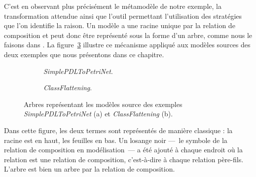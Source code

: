 C'est en observant plus précisément le métamodèle de notre exemple, la
transformation attendue ainsi que l'outil permettant l'utilisation des
stratégies que l'on identifie la raison. Un modèle {\emf} a une racine unique
par la relation de composition et peut donc être représenté sous la forme d'un
arbre, comme nous le faisons dans {\tom}. La figure~\ref{fig:treeexamples}
illustre ce mécanisme appliqué aux modèles sources des deux exemples que nous
présentons dans ce chapitre.


\begin{figure}[!h]
  \begin{center}
        \begin{subfigure}{0.45\linewidth}
          
                \caption{\emph{SimplePDLToPetriNet}.}
                \label{fig:treeexample1}
        \end{subfigure}
        \qquad %
        \begin{subfigure}{0.45\linewidth}
          
                \caption{\emph{ClassFlattening}.}
                \label{fig:treeexample2}
        \end{subfigure}
        \caption{Arbres représentant les modèles source des exemples \emph{SimplePDLToPetriNet} (a) et \emph{ClassFlattening} (b).}
        \label{fig:treeexamples}
  \end{center}
\end{figure}

Dans cette figure, les deux termes sont représentés de manière classique : la
racine est en haut, les feuilles en bas. Un losange noir ---~le symbole de la
relation de composition en modélisation~--- a été ajouté à chaque endroit où la
relation est une relation de composition, c'est-à-dire à chaque relation
père-fils. L'arbre est bien un arbre par la relation de composition.

